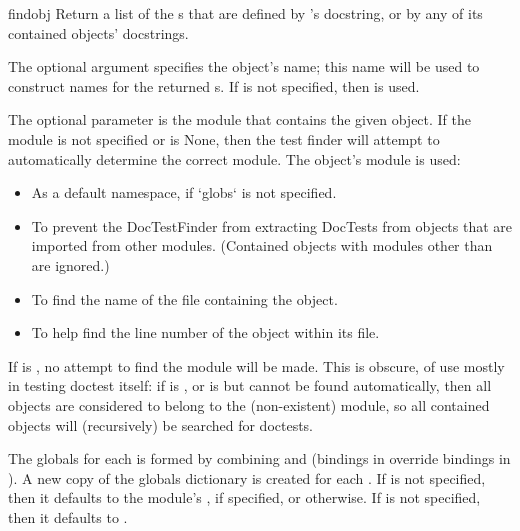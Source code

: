 \begin{methoddesc}{find}{obj}
    Return a list of the s that are defined by
    's docstring, or by any of its contained objects'
    docstrings.

    The optional argument  specifies the object's name; this
    name will be used to construct names for the returned
    s.  If  is not specified, then
     is used.

    The optional parameter  is the module that contains
    the given object.  If the module is not specified or is None, then
    the test finder will attempt to automatically determine the
    correct module.  The object's module is used:

    \begin{itemize}
    \item As a default namespace, if `globs` is not specified.
    \item To prevent the DocTestFinder from extracting DocTests
          from objects that are imported from other modules.  (Contained
          objects with modules other than  are ignored.)
    \item To find the name of the file containing the object.
    \item To help find the line number of the object within its file.
    \end{itemize}

    If  is , no attempt to find the module
    will be made.  This is obscure, of use mostly in testing doctest
    itself: if  is , or is  but
    cannot be found automatically, then all objects are considered to
    belong to the (non-existent) module, so all contained objects will
    (recursively) be searched for doctests.

    The globals for each  is formed by combining
     and  (bindings in 
    override bindings in ).  A new copy of the globals
    dictionary is created for each .  If  is
    not specified, then it defaults to the module's , if
    specified, or \code{\{\}} otherwise.  If  is not
    specified, then it defaults to \code{\{\}}.
\end{methoddesc}

